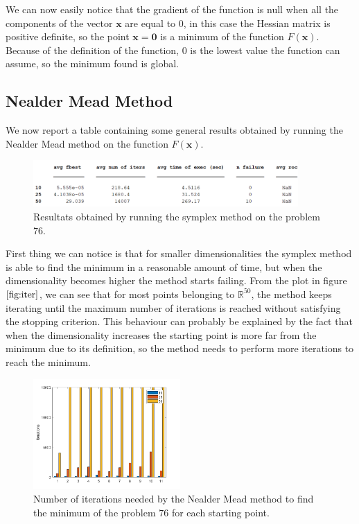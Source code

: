 We can now easily notice that the gradient of the function is null when all the components of the vector $\mathbf{x}$ are equal to 0, in this case the Hessian matrix is positive definite, so the point $\mathbf{x} = \mathbf{0}$ is a minimum of the function $F(\mathbf{x})$. 
Because of the definition of the function, $0$ is the lowest value the function can assume, so the minimum found is global.


\medskip
\subsection*{Nealder Mead Method}
We now report a table containing some general results obtained by running the Nealder Mead method on the function $F(\mathbf{x})$.

\begin{figure}[htbp]
    \centering
    \includegraphics[width = 0.9\textwidth]{img/pb76_table_SX.png}
    \caption{Resultats obtained by running the symplex method on the problem $76$.}
\end{figure}

First thing we can notice is that for smaller dimensionalities the symplex method is able to find the minimum in a reasonable amount of time, but when the dimensionality becomes higher the method starts failing.
From the plot in figure $\eqref{fig:iter}$, we can see that for most points belonging to $\mathbb{R}^{50}$, the method keeps iterating until the maximum number of iterations is reached without satisfying the stopping criterion.
This behaviour can probably be explained by the fact that when the dimensionality increases the starting point is more far from the minimum due to its definition, so the method needs to perform more iterations to reach the minimum.
\begin{figure}[htbp]
    \centering
    \includegraphics[width = 0.5\textwidth]{img/pb76_SX_iter.png}
    \caption{Number of iterations needed by the Nealder Mead method to find the minimum of the problem $76$ for each starting point.}
    \label{fig:iter}
\end{figure}

